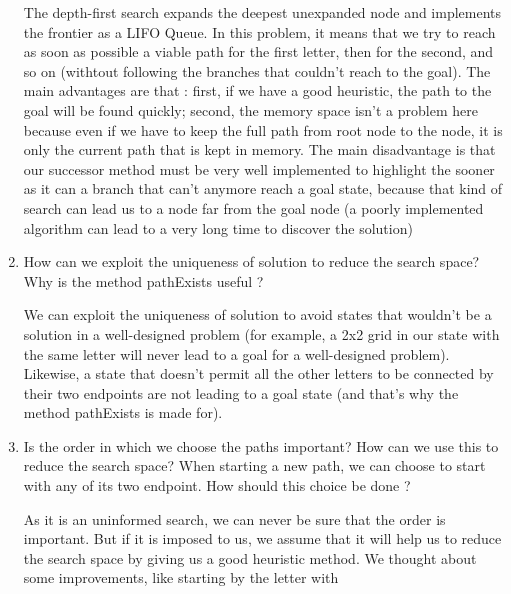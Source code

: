 \begin{enumerate}
\begin{framed}
            The depth-first search expands the deepest unexpanded node and
            implements the frontier as a LIFO Queue. In this problem, it
            means that we try to reach as soon as possible a viable path
            for the first letter, then for the second, and so on (withtout
            following the branches that couldn't reach to the goal). The
            main advantages are that : first, if we have a good heuristic, the path to
            the goal will be found quickly; second, the memory space isn't
            a problem here because even if we have to keep the full path
            from root node to the node, it is only the current path that is
            kept in memory. The main disadvantage is that our successor
            method must be very well implemented to highlight the sooner as
            it can a branch that can't anymore reach a goal state, because
            that kind of search can lead us to a node far from the goal
            node (a poorly implemented algorithm can lead to a very long
            time to discover the solution)
        \end{framed}
    \item How can we exploit the uniqueness of solution to reduce the
        search space? Why is the method pathExists useful ?
        \begin{framed}
            We can exploit the uniqueness of solution to avoid states that
            wouldn't be a solution in a well-designed problem (for example,
            a 2x2 grid in our state with the same letter will never
            lead to a goal for a well-designed problem). Likewise, a state
            that doesn't permit all the other letters to be connected by
            their two endpoints are not leading to a goal state (and that's
            why the method pathExists is made for).
        \end{framed}
    \item Is the order in which we choose the paths important? How can
        we use this to reduce the search space? When starting a new
        path, we can choose to start with any of its two endpoint. How
        should this choice be done ?
        \begin{framed}
            As it is an uninformed search, we can never be sure that the
            order is important. But if it is imposed to us, we assume that
            it will help us to reduce the search space by giving us a good
            heuristic method. We thought about some improvements, like starting by the letter with

\end{framed}
\end{enumerate}
